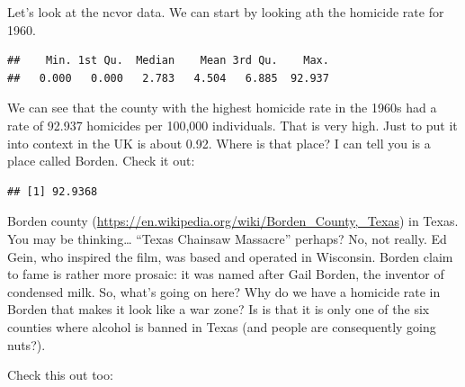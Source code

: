\documentclass[
]{book}
\newenvironment{Shaded}{\begin{snugshade}}{\end{snugshade}}
\newcommand{\FunctionTok}[1]{\textcolor[rgb]{0.00,0.00,0.00}{#1}}
\newcommand{\NormalTok}[1]{#1}
\newcommand{\OtherTok}[1]{\textcolor[rgb]{0.56,0.35,0.01}{#1}}
\newcommand{\SpecialCharTok}[1]{\textcolor[rgb]{0.00,0.00,0.00}{#1}}
\newcommand{\StringTok}[1]{\textcolor[rgb]{0.31,0.60,0.02}{#1}}
\begin{document}
Let's look at the ncvor data. We can start by looking ath the homicide rate for 1960.

\begin{Shaded}
\end{Shaded}

\begin{verbatim}
##    Min. 1st Qu.  Median    Mean 3rd Qu.    Max. 
##   0.000   0.000   2.783   4.504   6.885  92.937
\end{verbatim}

We can see that the county with the highest homicide rate in the 1960s had a rate of 92.937 homicides per 100,000 individuals. That is very high. Just to put it into context in the UK is about 0.92. Where is that place? I can tell you is a place called Borden. Check it out:

\begin{Shaded}
\end{Shaded}

\begin{verbatim}
## [1] 92.9368
\end{verbatim}

Borden county (\url{https://en.wikipedia.org/wiki/Borden_County,_Texas}) in Texas. You may be thinking\ldots{} ``Texas Chainsaw Massacre'' perhaps? No, not really. Ed Gein, who inspired the film, was based and operated in Wisconsin. Borden claim to fame is rather more prosaic: it was named after Gail Borden, the inventor of condensed milk. So, what's going on here? Why do we have a homicide rate in Borden that makes it look like a war zone? Is is that it is only one of the six counties where alcohol is banned in Texas (and people are consequently going nuts?).

Check this out too:

\begin{Shaded}
\end{Shaded}
\end{document}
